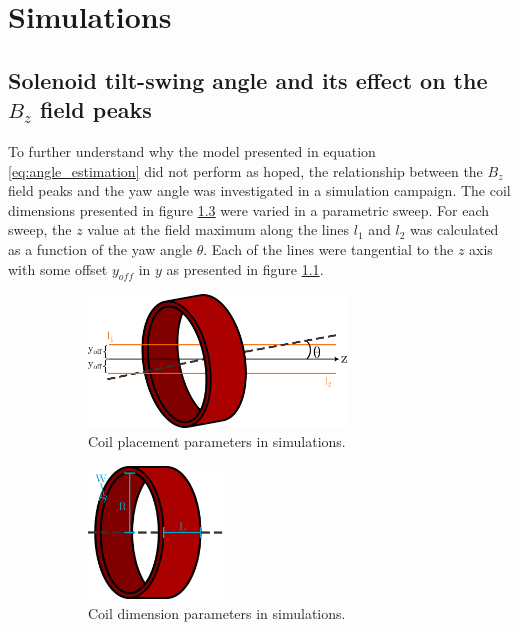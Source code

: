 \chapter{Simulations}

\section{Solenoid tilt-swing angle and its effect on the $B_z$ field peaks}
\label{sec:simulations}

To further understand why the model presented in equation
\ref{eq:angle_estimation} did not perform as hoped, the relationship
between the $B_z$ field peaks and the yaw angle was investigated in
a simulation campaign. The coil dimensions presented in figure
\ref{fig:sim-mag-dims} were varied in a parametric sweep.
For each sweep, the $z$ value at the field maximum along the lines $l_1$ and $l_2$
was calculated as a function of the yaw angle $\theta$. Each
of the lines were tangential to the $z$ axis with some offset
$y_{off}$ in $y$ as presented in figure \ref{fig:sim-mag-rot}.

\begin{figure}[h!]
    \centering
    \begin{subfigure}[b]{0.4\textwidth}
        \centering
        \includegraphics[height=100pt]{figs/sim_mag_rot}
        \caption{Coil placement parameters in simulations.}
        \label{fig:sim-mag-rot}
    \end{subfigure}
    \hfill
    \begin{subfigure}[b]{0.4\textwidth}
        \centering
        \includegraphics[height=100pt]{figs/sim_mag_dims}
        \caption{Coil dimension parameters in simulations.}
        \label{fig:sim-mag-dims}
    \end{subfigure}
    \caption{}
\end{figure}

